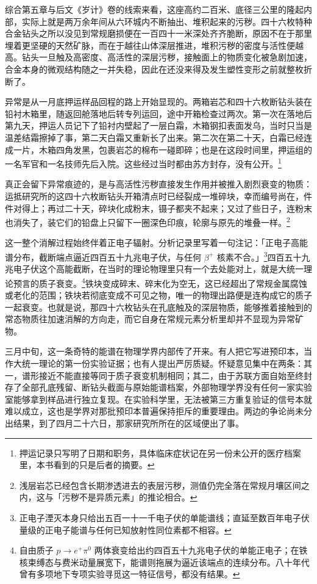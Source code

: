 综合第五章与后文《岁计》卷的线索来看，这座高约二百米、底径三公里的隆起内部，实际上就是两万余年间从六环城内不断抽出、堆积起来的污秽。四十六枚特种合金钻头之所以没见到常规磨损便在一百四十一米深处齐齐脆断，原因不在于那里埋着更坚硬的天然矿脉，而在于越往山体深层推进，堆积污秽的密度与活性便越高。钻头一旦触及高密度、高活性的深层污秽，接触面上的物质变化被急剧加速，合金本身的微观结构随之一并失稳，因此在还没来得及发生塑性变形之前就整枚折断了。

异常是从一月底押运样品回程的路上开始显现的。两箱岩芯和四十六枚断钻头装在铅衬木箱里，随返回舱落地后转专列运回，途中开箱检查过两次。第一次在落地后第九天，押运人员记下了铅衬内壁起了一层白霜，木箱钢扣表面发乌，当时只当是温差结霜擦掉了事，第二天白霜又重新长了出来。第二次在第二十天，白霜已经连成一片，木箱四角发黑，包裹岩芯的棉布一碰即碎；也是在这段时间里，押运组的一名军官和一名技师先后入院。这些经过当时都由苏方封存，没有公开。\footnote{押运记录只写明了日期和职务，具体临床症状记在另一份未公开的医疗档案里，本书看到的只是后者的摘要。}

真正会留下异常痕迹的，是与高活性污秽直接发生作用并被推入剧烈衰变的物质：运抵研究所的这四十六枚断钻头开箱清点时已经裂成一堆碎块，幸而编号尚在，件件对得上；再过二十天，碎块化成粉末，镊子都夹不起来；又过了些日子，连粉末也消失了，装它们的铅盘上只留下一圈深色印痕，轮廓与原先的堆叠一样。\footnote{浅层岩芯已经包含长期渗透进去的表层污秽，测值仍完全落在常规月壤区间之内，这与「污秽不是异质元素」的推论相合。}

这一整个消解过程始终伴着正电子辐射。分析记录里写着一句注记：「正电子高能谱分布，截断端点逼近四百五十九兆电子伏，与任何 $\beta^+$ 核素不合。」\footnote{正电子湮灭本身只给出五百一十一千电子伏的单能谱线；直延至数百年电子伏量级的正电子能谱与任何已知放射性同位素都不相容。}四百五十九兆电子伏这个高能截断，在当时的理论物理里只有一个去处能对上，就是大统一理论预言的质子衰变。\footnote{自由质子 $p \to e^+ \pi^0$ 两体衰变给出约四百五十九兆电子伏的单能正电子；在铁核束缚态与费米动量展宽下，能谱则拖展为逼近该端点的连续分布。八十年代曾有多项地下专项实验寻觅这一特征信号，都没有结果。}铁块变成碎末、碎末化为空无，这已经超出了常规金属腐蚀或老化的范围；铁块若彻底变成不可见之物，唯一的物理出路便是连构成它的质子一起衰变。也就是说，那四十六枚钻头在孔底触及的深层物质，能够推着接触到的常态物质往加速消解的方向走，而它自身在常规元素分析里却并不显现为异常矿物。

三月中旬，这一条奇特的能谱在物理学界内部传了开来。有人把它写进预印本，当作大统一理论的第一份实验证据；也有人提出严厉质疑。怀疑意见集中在两条：其一，谱形接近不能直接等同于质子衰变机制相同；其二，由于苏联方面自始至终封存了全部孔底残留、断钻头截面与原始能谱档案，外部物理学界没有任何一家实验室能够拿到样品进行独立复现。在实验科学里，无法被第三方重复验证的信号本就难以成立，这也是学界对那批预印本普遍保持拒斥的重要理由。两边的争论尚未分出结果，到了四月二十六日，那家研究所所在的区域便出了事。

